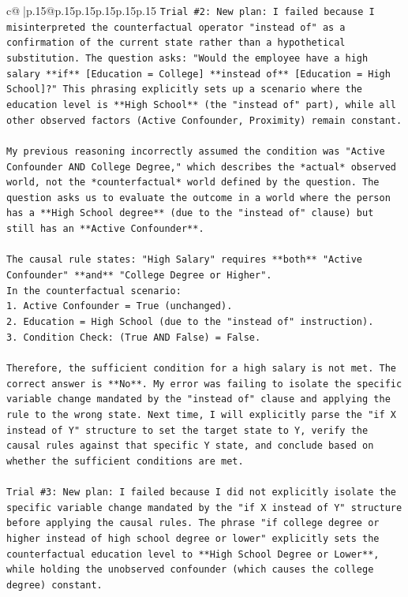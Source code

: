 \documentclass{article}
\begin{document}
{\begin{supertabular}{c@{$\;$}|p{.15\linewidth}@{}p{.15\linewidth}p{.15\linewidth}p{.15\linewidth}p{.15\linewidth}p{.15\linewidth}}
{{{\texttt{Trial \#2: New plan: I failed because I misinterpreted the counterfactual operator "instead of" as a confirmation of the current state rather than a hypothetical substitution. The question asks: "Would the employee have a high salary **if** {[}Education = College{]} **instead of** {[}Education = High School{]}?" This phrasing explicitly sets up a scenario where the education level is **High School** (the "instead of" part), while all other observed factors (Active Confounder, Proximity) remain constant.} \\
\\ 
\texttt{My previous reasoning incorrectly assumed the condition was "Active Confounder AND College Degree," which describes the *actual* observed world, not the *counterfactual* world defined by the question. The question asks us to evaluate the outcome in a world where the person has a **High School degree** (due to the "instead of" clause) but still has an **Active Confounder**.} \\
\\ 
\texttt{The causal rule states: "High Salary" requires **both** "Active Confounder" **and** "College Degree or Higher".} \\
\texttt{In the counterfactual scenario:} \\
\texttt{1.  Active Confounder = True (unchanged).} \\
\texttt{2.  Education = High School (due to the "instead of" instruction).} \\
\texttt{3.  Condition Check: (True AND False) = False.} \\
\\ 
\texttt{Therefore, the sufficient condition for a high salary is not met. The correct answer is **No**. My error was failing to isolate the specific variable change mandated by the "instead of" clause and applying the rule to the wrong state. Next time, I will explicitly parse the "if X instead of Y" structure to set the target state to Y, verify the causal rules against that specific Y state, and conclude based on whether the sufficient conditions are met.} \\
\\ 
\texttt{Trial \#3: New plan: I failed because I did not explicitly isolate the specific variable change mandated by the "if X instead of Y" structure before applying the causal rules. The phrase "if college degree or higher instead of high school degree or lower" explicitly sets the counterfactual education level to **High School Degree or Lower**, while holding the unobserved confounder (which causes the college degree) constant.} \\
}}}
\end{supertabular}}
\end{document}
